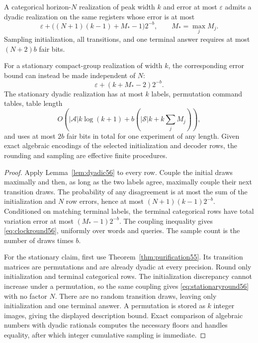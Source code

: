 \begin{theorem}\label{thm:bits56}
A categorical horizon-$N$ realization of peak width $k$ and error at most $\varepsilon$ admits a dyadic realization on the same registers whose error is at most
\begin{equation}\label{eq:clockround56}
       \varepsilon+\bigl((N+1)(k-1)+M_*-1\bigr)2^{-b},
                         \qquad M_* =\max_j M_j.
\end{equation}
Sampling initialization, all transitions, and one terminal answer requires at most $(N+2)b$ fair bits.

For a stationary compact-group realization of width $k$, the corresponding error bound can instead be made independent of $N$:
\begin{equation}\label{eq:stationaryround56}
                    \varepsilon+(k+M_*-2)2^{-b}.
\end{equation}
The stationary dyadic realization has at most $k$ labels, permutation command tables, table length
\[
 O\left(|\mathcal A|k\log(k+1)+
                   b\left(|\mathcal S|k+k\sum_jM_j\right)\right),
\]
and uses at most $2b$ fair bits in total for one experiment of any length. Given exact algebraic encodings of the selected initialization and decoder rows, the rounding and sampling are effective finite procedures.
\end{theorem}
\begin{proof}
Apply Lemma~\ref{lem:dyadic56} to every row. Couple the initial draws maximally and then, as long as the two labels agree, maximally couple their next transition draws. The probability of any disagreement is at most the sum of the initialization and $N$ row errors, hence at most $(N+1)(k-1)2^{-b}$. Conditioned on matching terminal labels, the terminal categorical rows have total variation error at most $(M_*-1)2^{-b}$. The coupling inequality gives \eqref{eq:clockround56}, uniformly over words and queries. The sample count is the number of draws times $b$.

For the stationary claim, first use Theorem~\ref{thm:purification55}. Its transition matrices are permutations and are already dyadic at every precision. Round only initialization and terminal categorical rows. The initialization discrepancy cannot increase under a permutation, so the same coupling gives \eqref{eq:stationaryround56} with no factor $N$. There are no random transition draws, leaving only initialization and one terminal answer. A permutation is stored as $k$ integer images, giving the displayed description bound. Exact comparison of algebraic numbers with dyadic rationals computes the necessary floors and handles equality, after which integer cumulative sampling is immediate.
\end{proof}

